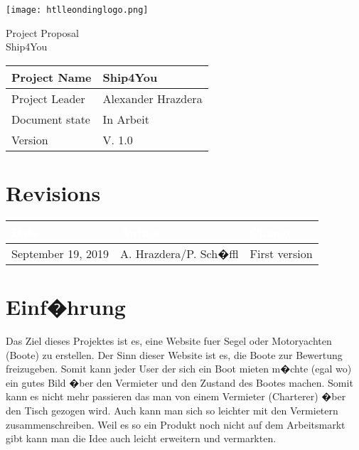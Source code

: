 \documentclass[12pt]{article}
\theoremstyle{definition}
\newenvironment{explanation}{%
   \setlength{\parindent}{0pt}
   \itshape
   \color{blue}
}{}
\newcommand{\projectname}{Ship4You}
\newcommand{\productname}{Ship4You}
\newcommand{\projectleader}{Alexander Hrazdera}
\newcommand{\documentstatus}{In Arbeit}
\newcommand{\version}{V. 1.0}
\begin{document}
\begin{titlepage}
\begin{flushright}
\texttt{[image: htlleondinglogo.png]}\\
\end{flushright}

\vspace{10em}

\begin{center}
{\Huge Project Proposal} \\[3em]
{\LARGE \productname} \\[3em]
\end{center}

\begin{flushleft}
\begin{tabular}{|l|l|}
\hline
Project Name & \projectname \\ \hline
Project Leader & \projectleader \\ \hline
Document state & \documentstatus \\ \hline
Version & \version \\ \hline
\end{tabular}
\end{flushleft}

\end{titlepage}
\section*{Revisions}
\begin{tabular}{|l|l|l|}
\hline
\cellcolor[gray]{0.5}\textcolor{white}{Date} & \cellcolor[gray]{0.5}\textcolor{white}{Author} & \cellcolor[gray]{0.5}\textcolor{white}{Change} \\ \hline
September 19, 2019&A. Hrazdera/P. Sch�ffl&First version \\ \hline
\end{tabular}
\pagebreak

\tableofcontents
\pagebreak

\section{Einf�hrung}
\begin{explanation}
Das Ziel dieses Projektes ist es, eine Website fuer Segel oder Motoryachten (Boote) zu erstellen. Der Sinn dieser Website ist es, die Boote zur Bewertung freizugeben. Somit kann jeder User der sich ein Boot mieten m�chte (egal wo) ein gutes Bild �ber den Vermieter und den Zustand des Bootes machen. Somit kann es nicht mehr passieren das man von einem Vermieter (Charterer) �ber den Tisch gezogen wird. Auch kann man sich so leichter mit den Vermietern zusammenschreiben. Weil es so ein Produkt noch nicht auf dem Arbeitsmarkt gibt kann man die Idee auch leicht erweitern und vermarkten. 

\end{explanation}
\pagebreak
\end{document}
